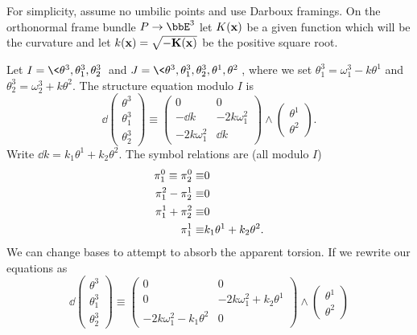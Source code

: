 \begin{example}
    For simplicity, assume no umbilic points and use Darboux framings. On the orthonormal frame bundle $P\to \bbE^3$ let $K(\bf{x})$ be a given function which will be the curvature and let $k(\bf{x})=\sqrt{-K(\bf{x})}$ be the positive square root.

    Let $I=\<\theta^3,\theta^3_1,\theta^3_2\>$ and $J=\<\theta^3,\theta^3_1,\theta^3_2,\theta^1,\theta^2\>$, where we set $\theta^3_1=\omega^3_1-k\theta^1$ and $\theta^3_2=\omega^3_2+k\theta^2$. The structure equation modulo $I$ is 
    \[\dd\begin{pmatrix}
        \theta^3\\\theta^3_1\\\theta^3_2
    \end{pmatrix}\equiv 
    \begin{pmatrix}
        0 & 0\\
        -\dd k & -2k\omega^2_1\\
        -2k\omega^2_1 & \dd k
    \end{pmatrix}
    \wedge \begin{pmatrix}
        \theta^1\\\theta^2
    \end{pmatrix}.
    \]
    Write $\dd k=k_1\theta^1+k_2\theta^2$. The symbol relations are  (all modulo $I$)
    \begin{align}
        \pi^0_1\equiv \pi^0_2\equiv& 0 \notag\\
        \pi^2_1-\pi^1_2\equiv& 0\notag\\
        \pi^1_1+\pi^2_2\equiv& 0\notag\\
        \pi^1_1\equiv& k_1\theta^1+k_2\theta^2.
    \end{align}
    We can change bases to attempt to absorb the apparent torsion. If we rewrite our equations as 
    \[\dd\begin{pmatrix}
        \theta^3\\\theta^3_1\\\theta^3_2
    \end{pmatrix}\equiv 
    \begin{pmatrix}
        0 & 0\\
        0 & -2k\omega^2_1+k_2\theta^1\\
        -2k\omega^2_1-k_1\theta^2 & 0
    \end{pmatrix}
    \wedge \begin{pmatrix}
        \theta^1\\\theta^2

\end{pmatrix}\]
\end{example}
